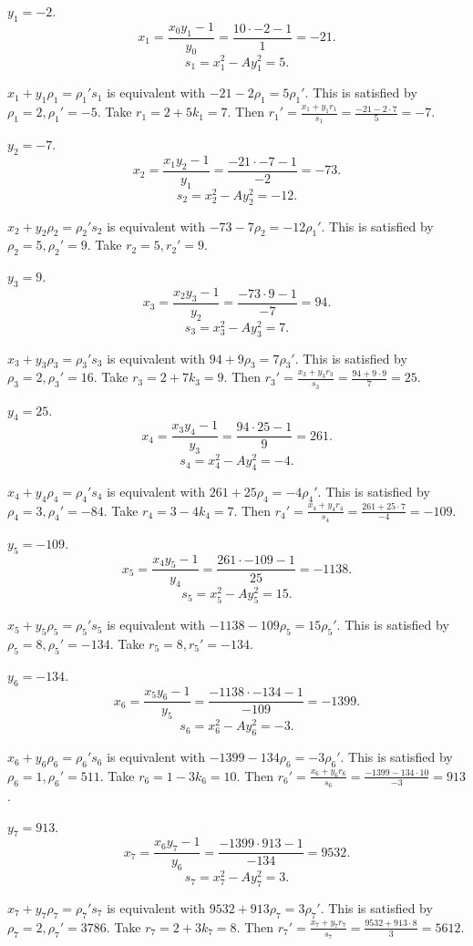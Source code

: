 \documentclass{article}
\theoremstyle{definition}
\begin{document}
$y_1=-2$.
\[
x_1 = \frac{x_0y_1-1}{y_0} = \frac{10 \cdot -2 - 1}{1} = -21.
\]
\[
s_1 = x_1^2 - Ay_1^2 = 5.
\]

$x_1+y_1\rho_1=\rho_1's_1$ is equivalent with
$-21-2\rho_1=5\rho_1'$. This is satisfied by
$\rho_1=2, \rho_1'=-5$.
Take $r_1 = 2 +5k_1 = 7$. 
Then $r_1' = \frac{x_1+y_1r_1}{s_1}
=\frac{-21 - 2 \cdot 7}{5} = -7$.

$y_2=-7$.
\[
x_2 = \frac{x_1y_2-1}{y_1} = \frac{-21 \cdot -7 - 1}{-2} = -73.
\]
\[
s_2 = x_2^2 - Ay_2^2 = -12.
\]

$x_2+y_2\rho_2=\rho_2's_2$ is equivalent with
$-73-7\rho_2=-12\rho_1'$. This is satisfied by
$\rho_2=5, \rho_2'=9$.
Take $r_2=5, r_2'=9$.

$y_3=9$.
\[
x_3 = \frac{x_2y_3-1}{y_2} = \frac{-73 \cdot 9 - 1}{-7} = 94.
\]
\[
s_3 = x_3^2 - Ay_3^2 = 7.
\]

$x_3+y_3\rho_3=\rho_3's_3$ is equivalent with
$94+9\rho_3=7\rho_3'$. This is satisfied by
$\rho_3=2, \rho_3'=16$.
Take $r_3=2+7k_3=9$.
Then $r_3'=\frac{x_3+y_3r_3}{s_3}
=\frac{94+9\cdot 9}{7} = 25$.

$y_4=25$.
\[
x_4 = \frac{x_3y_4-1}{y_3} = \frac{94\cdot 25-1}{9} = 261.
\]
\[
s_4 = x_4^2 - Ay_4^2 = -4.
\]

$x_4+y_4\rho_4=\rho_4's_4$ is equivalent with
$261+25\rho_4=-4\rho_4'$. This is satisfied by
$\rho_4=3, \rho_4'=-84$.
Take $r_4=3-4k_4=7$. 
Then $r_4' = \frac{x_4+y_4r_4}{s_4} =
\frac{261+25 \cdot 7}{-4}=-109$.

$y_5=-109$.
\[
x_5 = \frac{x_4y_5-1}{y_4} = \frac{261 \cdot -109-1}{25} = -1138.
\]
\[
s_5 = x_5^2 - Ay_5^2 = 15.
\]

$x_5+y_5\rho_5=\rho_5's_5$ is equivalent with
$-1138-109\rho_5=15\rho_5'$. This is satisfied by
$\rho_5=8, \rho_5'=-134$.
Take $r_5=8, r_5'=-134$.

$y_6=-134$.
\[
x_6 = \frac{x_5y_6-1}{y_5} = \frac{-1138 \cdot -134 - 1}{-109} = -1399.
\]
\[
s_6 = x_6^2 - Ay_6^2 = -3.
\]

$x_6+y_6\rho_6=\rho_6's_6$ is equivalent with
$-1399-134\rho_6=-3\rho_6'$. This is satisfied by
$\rho_6=1, \rho_6'=511$.
Take $r_6=1-3k_6 = 10$.
Then $r_6'=\frac{x_6+y_6r_6}{s_6}
=\frac{-1399 -134 \cdot 10}{-3}
=913$.

$y_7=913$.
\[
x_7 = \frac{x_6y_7-1}{y_6} = \frac{-1399 \cdot 913-1}{-134} = 9532.
\]
\[
s_7 = x_7^2 - Ay_7^2 = 3.
\]

$x_7+y_7\rho_7=\rho_7's_7$ is equivalent with
$9532+913\rho_7=3\rho_7'$. This is satisfied by
$\rho_7=2, \rho_7'=3786$.
Take $r_7=2+3k_7 = 8$.
Then $r_7'=\frac{x_7+y_7r_7}{s_7}
=\frac{9532 + 913 \cdot 8}{3}
=5612$.
\end{document}
